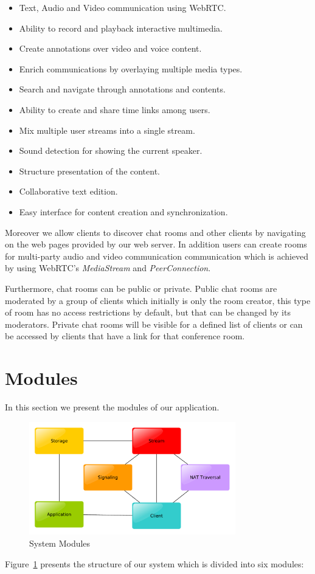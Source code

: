 \begin{itemize}
 \item Text, Audio and Video communication using \ac{WebRTC}.
 \item Ability to record and playback interactive multimedia.
 \item Create annotations over video and voice content.
 \item Enrich communications by overlaying multiple media types.
 \item Search and navigate through annotations and contents.
 \item Ability to create and share time links among users.
 \item Mix multiple user streams into a single stream.
 \item Sound detection for showing the current speaker.
 \item Structure presentation of the content.
 \item Collaborative text edition.
 \item Easy interface for content creation and synchronization. 
\end{itemize}

	Moreover we allow clients to discover chat rooms and other clients by navigating on the web pages provided by our web server. In addition users can create rooms for multi-party audio and video communication communication which is achieved by using \ac{WebRTC}'s \emph{MediaStream} and \emph{PeerConnection}.

	Furthermore, chat rooms can be public or private. Public chat rooms are moderated by a group of clients which initially is only the room creator, this type of room has no access restrictions by default, but that can be changed by its moderators. Private chat rooms will be visible for a defined list of clients or can be accessed by clients that have a link for that conference room.

\section{Modules}

	In this section we present the modules of our application.

\begin{figure}[!htb]
	\centering
	\includegraphics[width=0.8\textwidth]{figures/modules.pdf}
	\caption{System Modules}
        \label{fig:modules}
\end{figure}
	Figure~\ref{fig:modules} presents the structure of our system which is divided into six modules:

